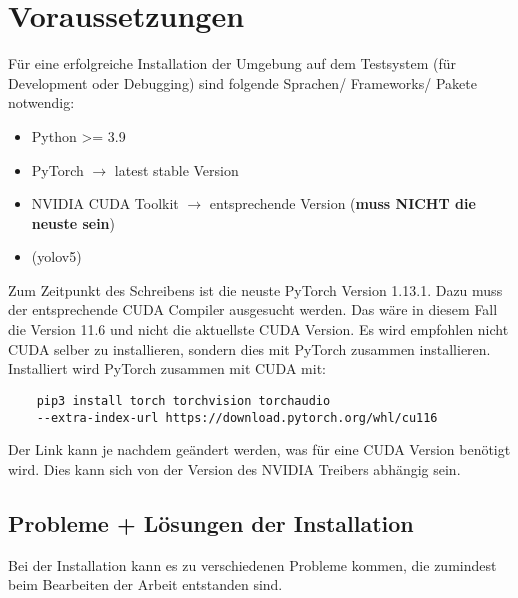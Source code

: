 \chapter{Voraussetzungen}

Für eine erfolgreiche Installation der Umgebung auf dem Testsystem (für Development oder Debugging) sind folgende Sprachen/ Frameworks/ Pakete notwendig:
\begin{itemize}
    \item Python >= 3.9
    \item PyTorch $\rightarrow$ latest stable Version
    \item NVIDIA CUDA Toolkit $\rightarrow$ entsprechende Version (\textbf{muss NICHT die neuste sein})
    \item (yolov5)
\end{itemize}

Zum Zeitpunkt des Schreibens ist die neuste PyTorch Version 1.13.1. Dazu muss der entsprechende CUDA Compiler ausgesucht werden. Das wäre in diesem Fall die Version 11.6 und nicht die aktuellste CUDA Version. Es wird empfohlen nicht CUDA selber zu installieren, sondern dies mit PyTorch zusammen installieren. Installiert wird PyTorch zusammen mit CUDA mit:
\begin{verbatim}
    pip3 install torch torchvision torchaudio 
    --extra-index-url https://download.pytorch.org/whl/cu116
\end{verbatim}
Der Link kann je nachdem geändert werden, was für eine CUDA Version benötigt wird. Dies kann sich von der Version des NVIDIA Treibers abhängig sein.
\section{Probleme + Lösungen der Installation}

Bei der Installation kann es zu verschiedenen Probleme kommen, die zumindest beim Bearbeiten der Arbeit entstanden sind.